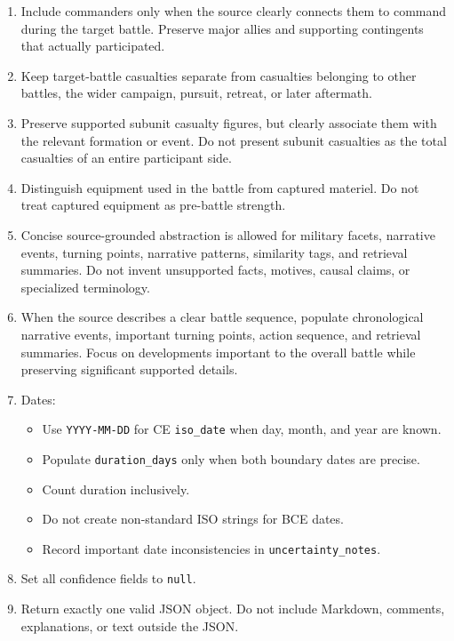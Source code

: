 \begin{enumerate}[
    leftmargin=1.2cm,
    itemsep=5pt,
    topsep=3pt,
    parsep=0pt,
    label=\textbf{\arabic*.}
]
    \item Include commanders only when the source clearly connects them to command during the target battle. Preserve major allies and supporting contingents that actually participated.

    \item Keep target-battle casualties separate from casualties belonging to other battles, the wider campaign, pursuit, retreat, or later aftermath.

    \item Preserve supported subunit casualty figures, but clearly associate them with the relevant formation or event. Do not present subunit casualties as the total casualties of an entire participant side.

    \item Distinguish equipment used in the battle from captured materiel. Do not treat captured equipment as pre-battle strength.

    \item Concise source-grounded abstraction is allowed for military facets, narrative events, turning points, narrative patterns, similarity tags, and retrieval summaries. Do not invent unsupported facts, motives, causal claims, or specialized terminology.

    \item When the source describes a clear battle sequence, populate chronological narrative events, important turning points, action sequence, and retrieval summaries. Focus on developments important to the overall battle while preserving significant supported details.

    \item Dates:
    \begin{itemize}[
        leftmargin=1.5em,
        itemsep=2pt,
        topsep=3pt,
        parsep=0pt
    ]
        \item Use \texttt{YYYY-MM-DD} for CE \texttt{iso\_date} when day, month, and year are known.
        \item Populate \texttt{duration\_days} only when both boundary dates are precise.
        \item Count duration inclusively.
        \item Do not create non-standard ISO strings for BCE dates.
        \item Record important date inconsistencies in \texttt{uncertainty\_notes}.
    \end{itemize}

    \item Set all confidence fields to \texttt{null}.

    \item Return exactly one valid JSON object. Do not include Markdown, comments, explanations, or text outside the JSON.

\end{enumerate}

